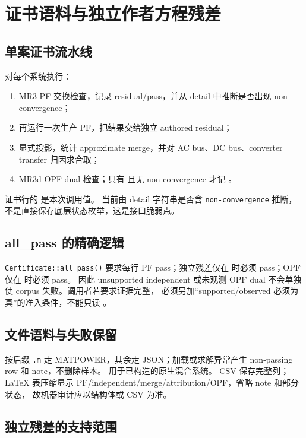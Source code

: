 \section{证书语料与独立作者方程残差}

\subsection{单案证书流水线}

 对每个系统执行：
\begin{enumerate}
  \item MR3 PF 交换检查，记录 residual/pass，并从 detail 中推断是否出现 non-convergence；
  \item 再运行一次生产 PF，把结果交给独立 authored residual；
  \item 显式投影，统计 approximate merge，并对 AC bus、DC bus、converter transfer 归因求合取；
  \item MR3d OPF dual 检查；只有  且无 non-convergence 才记
        。
\end{enumerate}
证书行的  是本次调用值。 当前由 detail 字符串是否含
\texttt{non-convergence} 推断，不是直接保存底层状态枚举，这是接口脆弱点。

\subsection{all\_pass 的精确逻辑}

\texttt{Certificate::all\_pass()} 要求每行 PF pass；独立残差仅在
 时必须 pass；OPF 仅在  时必须 pass。
因此 unsupported independent 或未观测 OPF dual 不会单独使 corpus 失败。调用者若要求证据完整，
必须另加“supported/observed 必须为真”的准入条件，不能只读 。

\subsection{文件语料与失败保留}

 按后缀 \texttt{.m} 走 MATPOWER，其余走 JSON；加载或求解异常产生
non-passing row 和 note，不删除样本。 用于已构造的原生混合系统。
CSV 保存完整列；LaTeX 表压缩显示 PF/independent/merge/attribution/OPF，省略 note 和部分状态，
故机器审计应以结构体或 CSV 为准。

\subsection{独立残差的支持范围}

